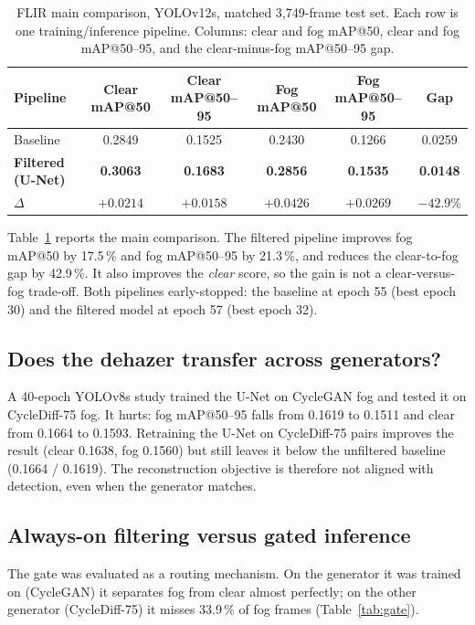 \documentclass[11pt,a4paper]{article}
\begin{document}
\begin{table}[H]
\centering
\small
\caption{FLIR main comparison, YOLOv12s, matched 3,749-frame test set. Each row is
one training/inference pipeline. Columns: clear and fog mAP@50, clear and fog
mAP@50--95, and the clear-minus-fog mAP@50--95 gap.}
\label{tab:flir-main}
\begin{tabular}{@{}lccccc@{}}
\toprule
Pipeline & Clear mAP@50 & Clear mAP@50--95 & Fog mAP@50 & Fog mAP@50--95 & Gap \\
\midrule
Baseline & 0.2849 & 0.1525 & 0.2430 & 0.1266 & 0.0259 \\
\textbf{Filtered (U-Net)} & \textbf{0.3063} & \textbf{0.1683} & \textbf{0.2856} & \textbf{0.1535} & \textbf{0.0148} \\
$\Delta$ & $+0.0214$ & $+0.0158$ & $+0.0426$ & $+0.0269$ & $-42.9\%$ \\
\bottomrule
\end{tabular}
\end{table}

Table~\ref{tab:flir-main} reports the main comparison. The filtered pipeline
improves fog mAP@50 by 17.5\,\% and fog mAP@50--95 by
21.3\,\%, and reduces the clear-to-fog gap by 42.9\,\%. It also improves the
\emph{clear} score, so the gain is not a clear-versus-fog trade-off. Both
pipelines early-stopped: the baseline at epoch 55 (best epoch 30) and the
filtered model at epoch 57 (best epoch 32).

\subsection{Does the dehazer transfer across generators?}
A 40-epoch YOLOv8s study trained the U-Net on CycleGAN fog and tested it on
CycleDiff-75 fog. It hurts: fog mAP@50--95 falls from 0.1619 to 0.1511 and clear
from 0.1664 to 0.1593. Retraining the U-Net on CycleDiff-75 pairs improves the
result (clear 0.1638, fog 0.1560) but still leaves it below the unfiltered
baseline (0.1664 / 0.1619). The reconstruction objective is therefore not
aligned with detection, even when the generator matches.

\subsection{Always-on filtering versus gated inference}
The gate was evaluated as a routing mechanism. On the generator it was trained
on (CycleGAN) it separates fog from clear almost perfectly; on the other
generator (CycleDiff-75) it misses 33.9\,\% of fog frames (Table~\ref{tab:gate}).
\end{document}
